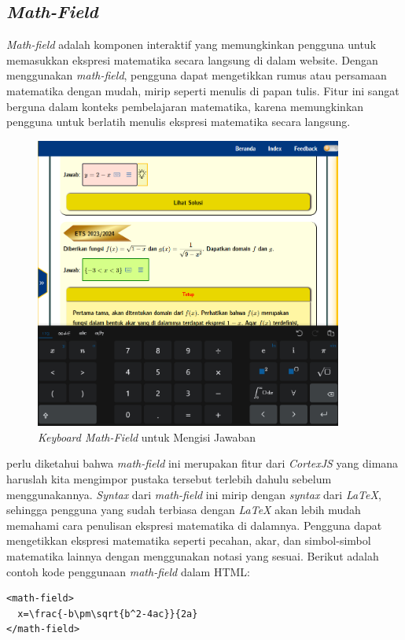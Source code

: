 \documentclass{file/KP-ITS}
\theoremstyle{definition}
\theoremstyle{definition}
\theoremstyle{plain}
\begin{document}
\subsection{\textit{Math-Field}}
\textit{Math-field} adalah komponen interaktif yang memungkinkan pengguna untuk memasukkan ekspresi matematika secara langsung di dalam website. Dengan menggunakan \textit{math-field}, pengguna dapat mengetikkan rumus atau persamaan matematika dengan mudah, mirip seperti menulis di papan tulis. Fitur ini sangat berguna dalam konteks pembelajaran matematika, karena memungkinkan pengguna untuk berlatih menulis ekspresi matematika secara langsung.
  \begin{figure}[h!]
    \centering
    \includegraphics[width=0.9\textwidth]{foto/IsiJawaban.png}
    \caption{\textit{Keyboard Math-Field} untuk Mengisi Jawaban}
  \end{figure}
  perlu diketahui bahwa \textit{math-field} ini merupakan fitur dari \textit{CortexJS} yang dimana haruslah kita mengimpor pustaka tersebut terlebih dahulu sebelum menggunakannya. \textit{Syntax} dari \textit{math-field} ini mirip dengan \textit{syntax} dari \textit{LaTeX}, sehingga pengguna yang sudah terbiasa dengan \textit{LaTeX} akan lebih mudah memahami cara penulisan ekspresi matematika di dalamnya. Pengguna dapat mengetikkan ekspresi matematika seperti pecahan, akar, dan simbol-simbol matematika lainnya dengan menggunakan notasi yang sesuai.
  Berikut adalah contoh kode penggunaan \textit{math-field} dalam HTML:
\begin{verbatim}
<math-field>
  x=\frac{-b\pm\sqrt{b^2-4ac}}{2a}
</math-field>
\end{verbatim}
\end{document}
